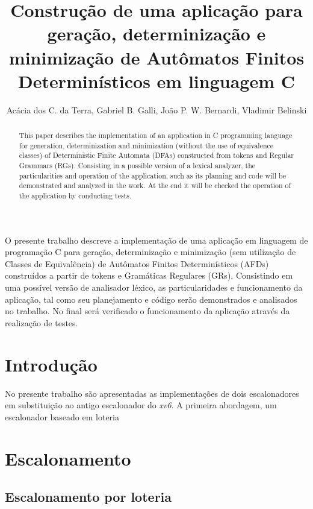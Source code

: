 \documentclass[12pt]{article}
\title{Construção de uma aplicação para geração, determinização e minimização de Autômatos Finitos Determinísticos em linguagem C}
\author{Acácia dos C. da Terra\inst{1}, Gabriel B. Galli\inst{1}, João P. W. Bernardi\inst{1}, Vladimir Belinski\inst{1} }
\begin{document}
 

\maketitle

\begin{abstract}
 This paper describes the implementation of an application in C programming language for generation, determinization and minimization (without the use of equivalence classes) of Deterministic Finite Automata (DFAs) constructed from tokens and Regular Grammars (RGs). Consisting in a possible version of a lexical analyzer, the particularities and operation of the application, such as its planning and code will be demonstrated and analyzed in the work. At the end it will be checked the operation of the application by conducting tests.
\end{abstract}
     
\begin{resumo} 
 O presente trabalho descreve a implementação de uma aplicação em linguagem de programação C para geração, determinização e minimização (sem utilização de Classes de Equivalência) de Autômatos Finitos Determinísticos (AFDs) construídos a partir de tokens e Gramáticas Regulares (GRs). Consistindo em uma possível versão de analisador léxico, as particularidades e funcionamento da aplicação, tal como seu planejamento e código serão demonstrados e analisados no trabalho. No final será verificado o funcionamento da aplicação através da realização de testes.

\end{resumo}


\section{Introdução}

No presente trabalho são apresentadas as implementações de dois escalonadores em substituição ao antigo escalonador do \emph{xv6}.  A primeira abordagem, um escalonador baseado em loteria

\section{Escalonamento}

\subsection{Escalonamento por loteria}
 
\end{document}
